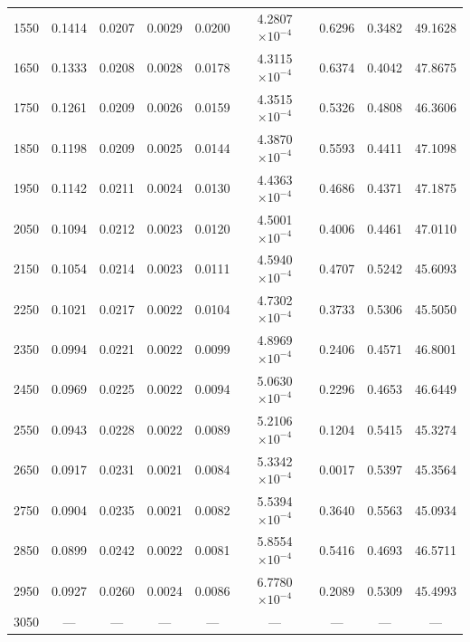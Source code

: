 \begin{table}[htbp]
\begin{tabular}{|c|c|c|c|c|c|c|c|c|}
    \hline
    1550 & 0.1414 & 0.0207 & 0.0029 & 0.0200 & 4.2807$\times 10^{-4}$ & 0.6296 & 0.3482 & 49.1628 \\
    1650 & 0.1333 & 0.0208 & 0.0028 & 0.0178 & 4.3115$\times 10^{-4}$ & 0.6374 & 0.4042 & 47.8675 \\
    1750 & 0.1261 & 0.0209 & 0.0026 & 0.0159 & 4.3515$\times 10^{-4}$ & 0.5326 & 0.4808 & 46.3606 \\
    1850 & 0.1198 & 0.0209 & 0.0025 & 0.0144 & 4.3870$\times 10^{-4}$ & 0.5593 & 0.4411 & 47.1098 \\
    1950 & 0.1142 & 0.0211 & 0.0024 & 0.0130 & 4.4363$\times 10^{-4}$ & 0.4686 & 0.4371 & 47.1875 \\
    \hline
    2050 & 0.1094 & 0.0212 & 0.0023 & 0.0120 & 4.5001$\times 10^{-4}$ & 0.4006 & 0.4461 & 47.0110 \\
    2150 & 0.1054 & 0.0214 & 0.0023 & 0.0111 & 4.5940$\times 10^{-4}$ & 0.4707 & 0.5242 & 45.6093 \\
    2250 & 0.1021 & 0.0217 & 0.0022 & 0.0104 & 4.7302$\times 10^{-4}$ & 0.3733 & 0.5306 & 45.5050 \\
    2350 & 0.0994 & 0.0221 & 0.0022 & 0.0099 & 4.8969$\times 10^{-4}$ & 0.2406 & 0.4571 & 46.8001 \\
    2450 & 0.0969 & 0.0225 & 0.0022 & 0.0094 & 5.0630$\times 10^{-4}$ & 0.2296 & 0.4653 & 46.6449 \\
    \hline
    2550 & 0.0943 & 0.0228 & 0.0022 & 0.0089 & 5.2106$\times 10^{-4}$ & 0.1204 & 0.5415 & 45.3274 \\
    2650 & 0.0917 & 0.0231 & 0.0021 & 0.0084 & 5.3342$\times 10^{-4}$ & 0.0017 & 0.5397 & 45.3564 \\
    2750 & 0.0904 & 0.0235 & 0.0021 & 0.0082 & 5.5394$\times 10^{-4}$ & 0.3640 & 0.5563 & 45.0934 \\
    2850 & 0.0899 & 0.0242 & 0.0022 & 0.0081 & 5.8554$\times 10^{-4}$ & 0.5416 & 0.4693 & 46.5711 \\
    2950 & 0.0927 & 0.0260 & 0.0024 & 0.0086 & 6.7780$\times 10^{-4}$ & 0.2089 & 0.5309 & 45.4993 \\
    \hline
    3050 & --- & --- & --- & --- & --- & --- & --- & --- \\
    \hline
  \end{tabular}
\end{table}

